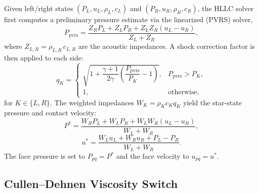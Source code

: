 \documentclass[twocolumn]{aastex63}
\newcommand{\vel}{{u}}
\begin{document}
Given left/right states $(P_L, \vel_L, \rho_L, c_L)$ and
$(P_R, \vel_R, \rho_R, c_R)$, the HLLC solver
\citep[e.g.,][]{toro2009} first computes
a preliminary pressure estimate via the linearized (PVRS) solver,
\begin{equation}
  P_\text{pvrs}
  = \frac{Z_R P_L + Z_L P_R + Z_L Z_R (\vel_L - \vel_R)}{Z_L + Z_R},
\end{equation}
where $Z_{L,R} = \rho_{L,R}\,c_{L,R}$ are the acoustic impedances.
A shock correction factor is then applied to each side:
\begin{equation}
  q_K = \begin{cases}
    \sqrt{1 + \dfrac{\gamma+1}{2\gamma}\left(\dfrac{P_\text{pvrs}}{P_K}-1\right)}, & P_\text{pvrs} > P_K, \\[6pt]
    1, & \text{otherwise},
  \end{cases}
\end{equation}
for $K \in \{L,R\}$.
The weighted impedances $W_K = \rho_K c_K q_K$ yield the star-state
pressure and contact velocity:
\begin{equation}
  P^* = \frac{W_R P_L + W_L P_R + W_L W_R(\vel_L - \vel_R)}{W_L + W_R},
\end{equation}
\begin{equation}
  \vel^* = \frac{W_L \vel_L + W_R \vel_R + P_L - P_R}{W_L + W_R}.
\end{equation}
The face pressure is set to $P_{pq} = P^*$ and the face velocity to
$\vel_{pq} = \vel^*$.


\subsection{Cullen--Dehnen Viscosity Switch}
\end{document}
